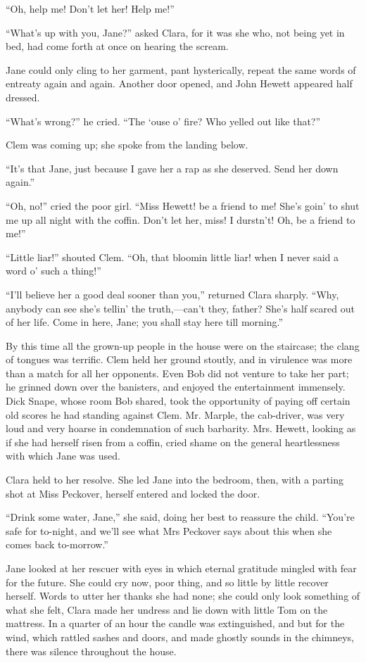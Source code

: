 ``Oh, help me! Don't let her! Help me!''

``What's up with you, Jane?'' asked Clara, for it was she who, not being
yet in bed, had come forth at once on hearing the scream.

Jane could only cling to her garment, pant hysterically, repeat the same
words of entreaty again and again. Another door opened, and John Hewett
appeared half dressed.

``What's wrong?'' he cried. ``The `ouse o' fire? Who yelled out like
that?''

Clem was coming up; she spoke from the landing below.

{}``It's that Jane, just because I gave her a rap as she deserved. Send
her down again.''

``Oh, no!'' cried the poor girl. ``Miss Hewett! be a friend to me! She's
goin' to shut me up all night with the coffin. Don't let her, miss! I
durstn't! Oh, be a friend to me!''

``Little liar!'' shouted Clem. ``Oh, that bloomin little liar! when I
never said a word o' such a thing!''

``I'll believe her a good deal sooner than you,'' returned Clara
sharply. ``Why, anybody can see she's tellin' the truth,---can't they,
father? She's half scared out of her life. Come in here, Jane; you shall
stay here till morning.''

By this time all the grown-up people in the house were on the staircase;
the clang of tongues was terrific. Clem held her ground stoutly, and in
virulence was more than a match for all her opponents. Even Bob did not
venture to take her part; he grinned down over the banisters, and
enjoyed the entertainment immensely. Dick Snape, whose {}room Bob
shared, took the opportunity of paying off certain old scores he had
standing against Clem. Mr. Marple, the cab-driver, was very loud and
very hoarse in condemnation of such barbarity. Mrs. Hewett, looking as
if she had herself risen from a coffin, cried shame on the general
heartlessness with which Jane was used.

Clara held to her resolve. She led Jane into the bedroom, then, with a
parting shot at Miss Peckover, herself entered and locked the door.

``Drink some water, Jane,'' she said, doing her best to reassure the
child. ``You're safe for to-night, and we'll see what Mrs Peckover says
about this when she comes back to-morrow.''

Jane looked at her rescuer with eyes in which eternal gratitude mingled
with fear for the future. She could cry now, poor thing, and so little
by little recover herself. Words to utter her thanks she had none; she
could only look something of what she felt, Clara made her undress and
lie down with little {}Tom on the mattress. In a quarter of an hour the
candle was extinguished, and but for the wind, which rattled sashes and
doors, and made ghostly sounds in the chimneys, there was silence
throughout the house.

